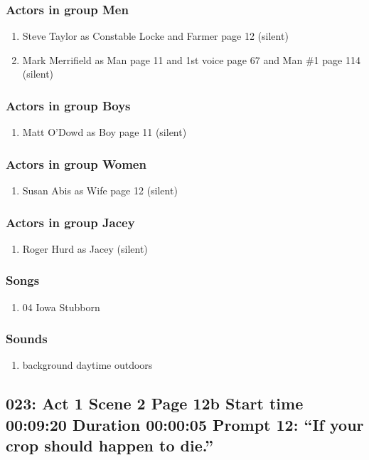 \subsubsection{Actors in group Men}
\begin{enumerate}
\item Steve Taylor as Constable Locke and Farmer page 12 (silent)
\item Mark Merrifield as Man page 11 and 1st voice page 67 and Man \#1 page 114 (silent)
\end{enumerate}
\subsubsection{Actors in group Boys}
\begin{enumerate}
\item Matt O'Dowd as Boy page 11 (silent)
\end{enumerate}
\subsubsection{Actors in group Women}
\begin{enumerate}
\item Susan Abis as Wife page 12 (silent)
\end{enumerate}
\subsubsection{Actors in group Jacey}
\begin{enumerate}
\item Roger Hurd as Jacey (silent)
\end{enumerate}

\subsubsection{Songs}
\begin{enumerate}
\item 04 Iowa Stubborn
\end{enumerate}\subsubsection{Sounds}
\begin{enumerate}
\item background daytime outdoors
\end{enumerate}
\subsection{023: Act 1 Scene 2 Page 12b Start time 00:09:20 Duration 00:00:05 Prompt 12: ``If your crop should happen to die.''}

